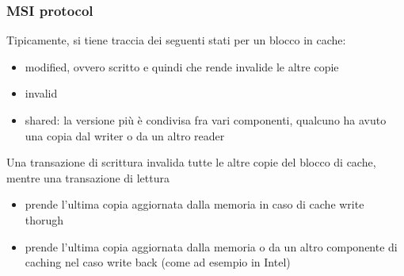 \documentclass[12pt, oneside]{extbook}
\begin{document}
\subsubsection{MSI protocol}
Tipicamente, si tiene traccia dei seguenti stati per un blocco in cache:
\begin{itemize}
\item modified, ovvero scritto e quindi che rende invalide le altre copie
\item invalid
\item shared: la versione più è condivisa fra vari componenti, qualcuno ha avuto una copia dal writer o da un altro reader
\end{itemize}
Una transazione di scrittura invalida tutte le altre copie del blocco di cache, mentre una transazione di lettura
\begin{itemize}
\item prende l'ultima copia aggiornata dalla memoria in caso di cache write thorugh
\item prende l'ultima copia aggiornata dalla memoria o da un altro componente  di caching nel caso write back (come ad esempio in Intel)
\end{itemize}
\end{document}
